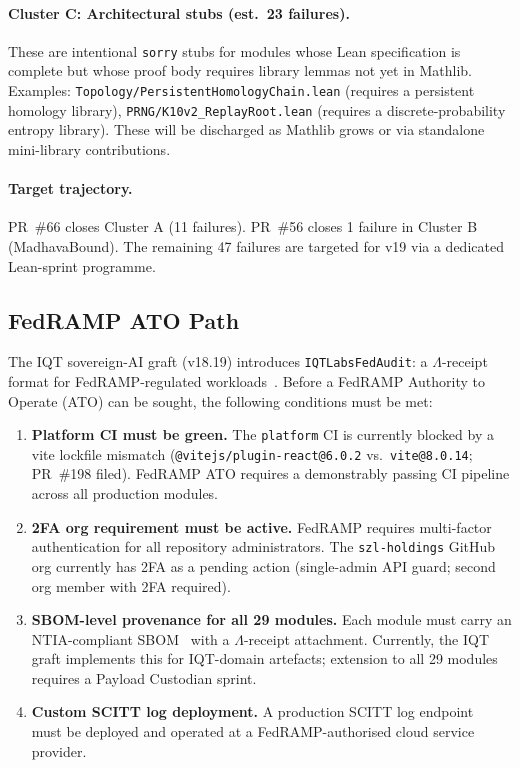 \paragraph{Cluster C: Architectural stubs (est.\ 23 failures).}
These are intentional \texttt{sorry} stubs for modules whose Lean
specification is complete but whose proof body requires library lemmas not
yet in Mathlib.
Examples: \texttt{Topology/PersistentHomologyChain.lean} (requires a
persistent homology library), \texttt{PRNG/K10v2\_ReplayRoot.lean}
(requires a discrete-probability entropy library).
These will be discharged as Mathlib grows or via standalone mini-library
contributions.

\paragraph{Target trajectory.}
PR~\#66 closes Cluster A (11 failures).
PR~\#56 closes 1 failure in Cluster B (MadhavaBound).
The remaining 47 failures are targeted for v19 via a dedicated
Lean-sprint programme.

\subsection{FedRAMP ATO Path}
\label{ssec:fedramp}

The IQT sovereign-AI graft (v18.19) introduces
\texttt{IQTLabsFedAudit}: a \(\Lambda\)-receipt format for FedRAMP-regulated
workloads~\cite{fedramp2023rev5}.
Before a FedRAMP Authority to Operate (ATO) can be sought, the following
conditions must be met:

\begin{enumerate}
  \item \textbf{Platform CI must be green.}
    The \texttt{platform} CI is currently blocked by a vite lockfile
    mismatch (\texttt{@vitejs/plugin-react@6.0.2} vs.\ \texttt{vite@8.0.14};
    PR~\#198 filed).
    FedRAMP ATO requires a demonstrably passing CI pipeline across all
    production modules.
  \item \textbf{2FA org requirement must be active.}
    FedRAMP requires multi-factor authentication for all repository
    administrators.
    The \texttt{szl-holdings} GitHub org currently has 2FA as a pending
    action (single-admin API guard; second org member with 2FA required).
  \item \textbf{SBOM-level provenance for all 29 modules.}
    Each module must carry an NTIA-compliant SBOM~\cite{ntia2021sbom} with
    a \(\Lambda\)-receipt attachment.
    Currently, the IQT graft implements this for IQT-domain artefacts;
    extension to all 29 modules requires a Payload Custodian sprint.
  \item \textbf{Custom SCITT log deployment.}
    A production SCITT log endpoint~\cite{ietf2024scitt} must be deployed
    and operated at a FedRAMP-authorised cloud service provider.
\end{enumerate}

